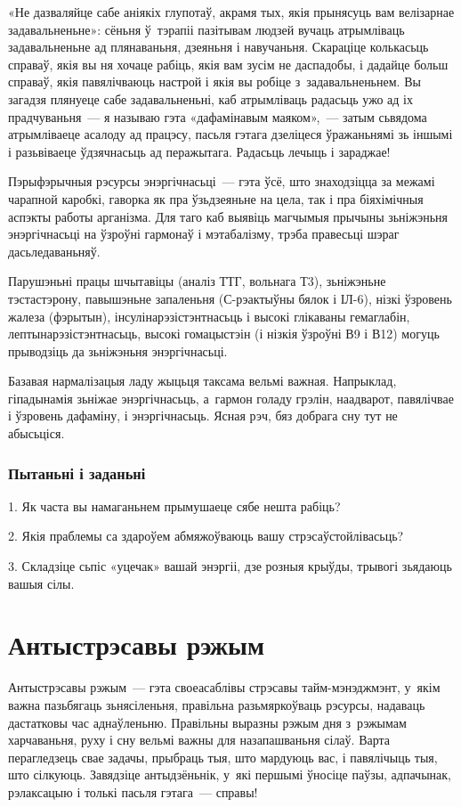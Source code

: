 «Не дазваляйце сабе аніякіх глупотаў, акрамя тых, якія прынясуць вам велізарнае задавальненьне»: сёньня ў~тэрапіі пазітывам людзей вучаць атрымліваць задавальненьне ад плянаваньня, дзеяньня і навучаньня. Скараціце колькасьць справаў, якія вы ня хочаце рабіць, якія вам зусім не даспадобы, і дадайце больш справаў, якія павялічваюць настрой і якія вы робіце з~задавальненьнем. Вы загадзя плянуеце сабе задавальненьні, каб атрымліваць радасьць ужо ад іх прадчуваньня~--- я называю гэта «дафамінавым маяком»,~--- затым сьвядома атрымліваеце асалоду ад працэсу, пасьля гэтага дзеліцеся ўражаньнямі зь іншымі і разьвіваеце ўдзячнасьць ад перажытага. Радасьць лечыць і зараджае!

Пэрыфэрычныя рэсурсы энэргічнасьці~--- гэта ўсё, што знаходзіцца за межамі чарапной каробкі, гаворка як пра ўзьдзеяньне на цела, так і пра біяхімічныя аспэкты работы арганізма. Для таго каб выявіць магчымыя прычыны зьніжэньня энэргічнасьці на ўзроўні гармонаў і мэтабалізму, трэба правесьці шэраг дасьледаваньняў.

Парушэньні працы шчытавіцы (аналіз ТТГ, вольнага Т3), зьніжэньне тэстастэрону, павышэньне запаленьня (С-рэактыўны бялок і ІЛ-6), нізкі ўзровень жалеза (фэрытын), інсулінарэзістэнтнасьць і высокі глікаваны гемаглабін, лептынарэзістэнтнасьць, высокі гомацыстэін (і нізкія ўзроўні В9 і В12) могуць прыводзіць да зьніжэньня энэргічнасьці.

Базавая нармалізацыя ладу жыцьця таксама вельмі важная. Напрыклад, гіпадынамія зьніжае энэргічнасьць, а~гармон голаду грэлін, наадварот, павялічвае і ўзровень дафаміну, і энэргічнасьць. Ясная рэч, бяз добрага сну тут не абысьціся.

\subsubsection{Пытаньні і заданьні}

1. Як часта вы намаганьнем прымушаеце сябе нешта рабіць?

2. Якія праблемы са здароўем абмяжоўваюць вашу стрэсаўстойлівасьць?

3. Складзіце сьпіс «уцечак» вашай энэргіі, дзе розныя крыўды, трывогі зьядаюць вашыя сілы.


\section{Антыстрэсавы рэжым}

Антыстрэсавы рэжым~--- гэта своеасаблівы стрэсавы тайм-мэнэджмэнт, у~якім важна пазьбягаць зьнясіленьня, правільна разьмяркоўваць рэсурсы, надаваць дастатковы час аднаўленьню. Правільны выразны рэжым дня з~рэжымам харчаваньня, руху і сну вельмі важны для назапашваньня сілаў. Варта перагледзець свае задачы, прыбраць тыя, што мардуюць вас, і павялічыць тыя, што сілкуюць. Завядзіце антыдзёньнік, у~які першымі ўносіце паўзы, адпачынак, рэлаксацыю і толькі пасьля гэтага~--- справы!

